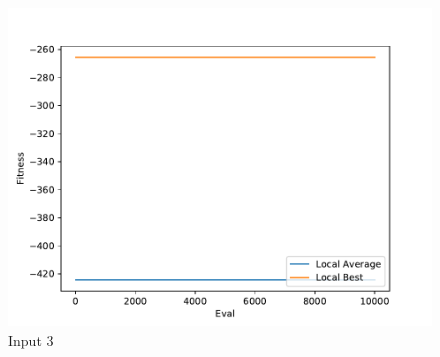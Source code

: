\documentclass{standalone}
\begin{document}
\begin{figure}[!htb]
	\caption{Input 3}
	\label{fig:graph_3027}
	\includegraphics[width=\textwidth]{../graphs/graphs/3027.pdf}
\end{figure}
\end{document}
